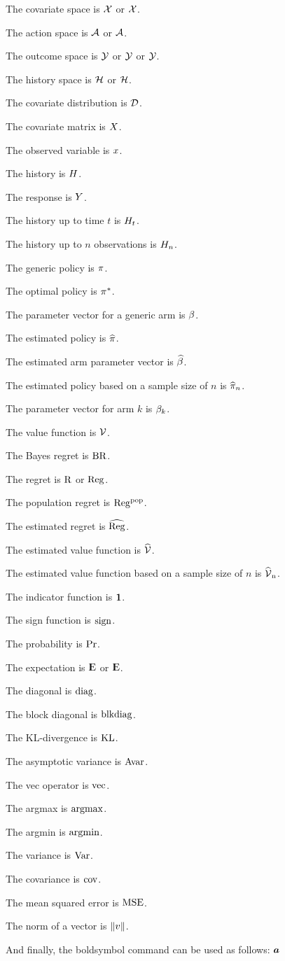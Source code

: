 \documentclass{article}
\begin{document}
The covariate space is $\mathcal{X}$ or $\mathcal{X}$.

The action space is $\mathcal{A}$ or $\mathcal{A}$.

The outcome space is $\mathcal{Y}$ or $\mathcal{Y}$ or $\mathcal{Y}$.

The history space is $\mathcal{H}$ or $\mathcal{H}$.

The covariate distribution is $\mathcal{D}$.

The covariate matrix is $X$.

The observed variable is $x$.

The history is $H$.

The response is $Y$.

The history up to time $t$ is $H_t$.

The history up to $n$ observations is $H_n$.

The generic policy is $\pi$.

The optimal policy is $\pi^{*}$.

The parameter vector for a generic arm is $\beta$.

The estimated policy is $\widehat{\pi}$.

The estimated arm parameter vector is $\widehat{\beta}$.

The estimated policy based on a sample size of $n$ is $\widehat{\pi}_{n}$.

The parameter vector for arm $k$ is $\beta_{k}$.

The value function is $\operatorname{{\mathcal{V} }}$.

The Bayes regret is $\operatorname{BR}$.

The regret is $\operatorname{\rm R}$ or $\operatorname{\rm Reg}$.

The population regret is $\operatorname{\rm Reg^{pop}}$.

The estimated regret is $\widehat{\operatorname{\rm Reg}}$.

The estimated value function is $\operatorname{{\widehat{\operatorname{{\mathcal{V} }}}}}$.

The estimated value function based on a sample size of $n$ is $\operatorname{{\widehat{\operatorname{{\mathcal{V} }}}}_{n}}$.

The indicator function is $\operatorname{{\boldsymbol{1}}}$.

The sign function is $\operatorname{sign}$.

The probability is $\operatorname{{\mathrm{Pr}}}$.

The expectation is $\operatorname{{\rm I\kern-.3em E}}$ or $\operatorname{\operatorname{{\rm I\kern-.3em E}}}$.

The diagonal is $\operatorname{diag}$.

The block diagonal is $\operatorname{blkdiag}$.

The KL-divergence is $\operatorname{\rm KL}$.

The asymptotic variance is $\operatorname{{\mathrm{Avar}}}$.

The vec operator is $\operatorname{vec}$.

The argmax is $\operatorname*{argmax}$.

The argmin is $\operatorname*{argmin}$.

The variance is $\operatorname{{\mathrm{Var}}}$.

The covariance is $\operatorname{{\mathrm{cov}}}$.

The mean squared error is $\operatorname{{\mathrm{MSE}}}$.

The norm of a vector is $\left\lVert v\right\rVert$.

And finally, the boldsymbol command can be used as follows: $\boldsymbol{a}$
\end{document}
